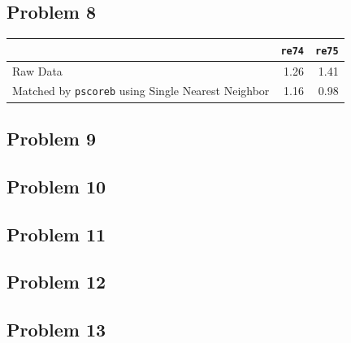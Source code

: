 \documentclass{article}
\begin{document}
\begin{center}

\end{center}

\subsection*{Problem 8}

\begin{center}
\begin{tabular}{ l r r}
\hline
& \texttt{re74} & \texttt{re75} \\ 
\hline
Raw Data  & 1.26 &  1.41 \\  
Matched by \texttt{pscoreb} using Single Nearest Neighbor & 1.16 & 0.98 \\
\hline
\end{tabular}
\end{center}


\subsection*{Problem 9}

\begin{center}

\end{center}

\subsection*{Problem 10}

\begin{center}

\end{center}

\subsection*{Problem 11}

\begin{center}

\end{center}


\begin{center}

\end{center}


\subsection*{Problem 12}

\begin{center}

\end{center}

\begin{center}

\end{center}

\subsection*{Problem 13}

%
\end{document}
